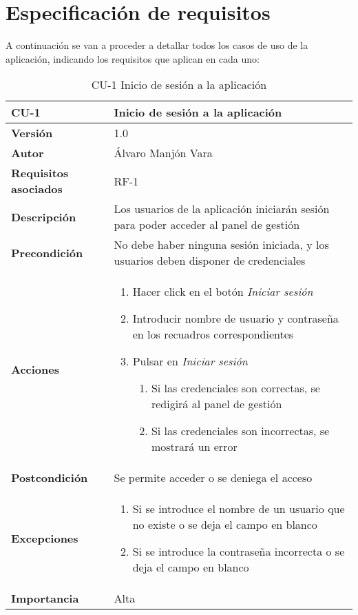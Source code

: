 \section{Especificación de requisitos}

A continuación se van a proceder a detallar todos los casos de uso de la aplicación, indicando los requisitos que aplican en cada uno:

\begin{table}[htp]
	\centering
	\begin{tabularx}{\linewidth}{ p{} p{} }
		\toprule
		\textbf{CU-1}    & \textbf{Inicio de sesión a la aplicación}\\
		\toprule
		\textbf{Versión}              & 1.0    \\
		\textbf{Autor}                & Álvaro Manjón Vara \\
		\textbf{Requisitos asociados} & RF-1 \\
		\textbf{Descripción}          & Los usuarios de la aplicación iniciarán sesión para poder acceder al panel de gestión \\
		\textbf{Precondición}         & No debe haber ninguna sesión iniciada, y los usuarios deben disponer de credenciales \\
		\textbf{Acciones}             &
		\begin{enumerate}
			\def\labelenumi{\arabic{enumi}.}
			\tightlist
			\item Hacer click en el botón \textit{Iniciar sesión}
			\item Introducir nombre de usuario y contraseña en los recuadros correspondientes
			\item Pulsar en \textit{Iniciar sesión}
			\begin{enumerate}
				\item Si las credenciales son correctas, se redigirá al panel de gestión
				\item Si las credenciales son incorrectas, se mostrará un error
			\end{enumerate}
		\end{enumerate} \\
		\textbf{Postcondición}        & Se permite acceder o se deniega el acceso \\
		\textbf{Excepciones}          & \begin{enumerate}
			\def\labelenumi{\arabic{enumi}.}
			\tightlist
			\item Si se introduce el nombre de un usuario que no existe o se deja el campo en blanco
			\item Si se introduce la contraseña incorrecta o se deja el campo en blanco
		\end{enumerate} \\
		\textbf{Importancia}          & Alta \\
		\bottomrule
	\end{tabularx}
	\caption{CU-1 Inicio de sesión a la aplicación}
\end{table}
\afterpage{\clearpage}

